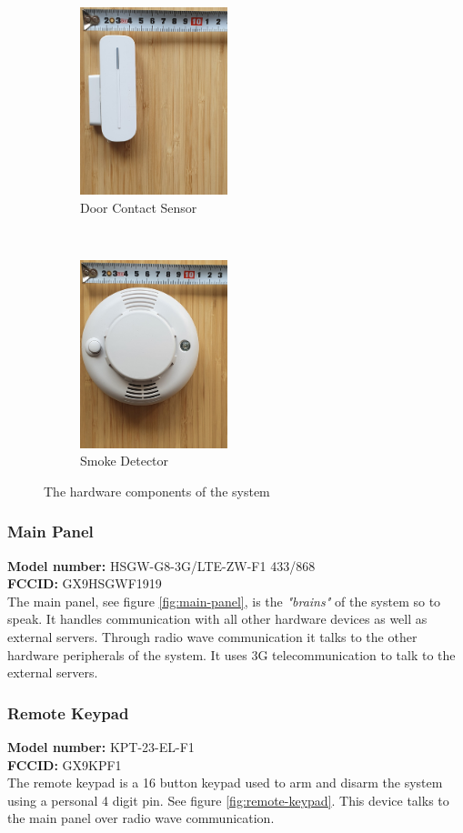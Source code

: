 \begin{figure}[!ht]
    \begin{subfigure}[t]{0.33\textwidth}
        \includegraphics[height=2.15in]{images/door-contact.png}
        \caption{Door Contact Sensor}
        \label{fig:door-contact}
    \end{subfigure}%
    ~
    \begin{subfigure}[t]{0.33\textwidth}
        \includegraphics[height=2.15in]{images/smoke-detector.png}
        \caption{Smoke Detector}
        \label{fig:smoke-detector}
    \end{subfigure}
    \caption{The hardware components of the system}
    \label{fig:hardware-components}
\end{figure}
\subsubsection{Main Panel}
\textbf{Model number:} HSGW-G8-3G/LTE-ZW-F1 433/868 \\
\textbf{FCCID:} GX9HSGWF1919 \\
The main panel, see figure \ref{fig:main-panel}, is the \textit{"brains"} of the system so to speak. It handles communication with all other hardware devices as well as external servers. Through radio wave communication it talks to the other hardware peripherals of the system. It uses 3G telecommunication to talk to the external servers.

\subsubsection{Remote Keypad}
\textbf{Model number:} KPT-23-EL-F1 \\ %
\textbf{FCCID:} GX9KPF1 \\ %
The remote keypad is a 16 button keypad used to arm and disarm the system using a personal 4 digit pin. See figure \ref{fig:remote-keypad}. This device talks to the main panel over radio wave communication.

